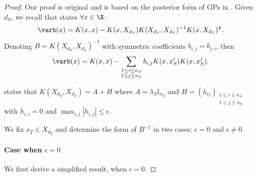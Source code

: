 \begin{proof}
Our proof is original and is based on the posterior form of GPs in .
Given $d_S$, we recall  that states $\forall x\in\X$:
\begin{align*}
    \varb(x) =K(x, x)-K(x, X_{d_S})K(X_{d_S}, X_{d_S})^{-1} K(x, X_{d_S})^\intercal.
\end{align*}
Denoting $B=K(X_{d_S},X_{d_S})^{-1}$ with symmetric coefficients $b_{i,j}=b_{j,i}$, then
\begin{equation} \label{eq:inversion}
    \varb(x) = K(x, x)-\sum_{\substack{1 \leq i \leq n_S \\ 1 \leq j \leq n_S}} b_{i, j} K(x, x_S^i) K(x, x_S^j).
\end{equation}

 states that
$K(X_{d_S}, X_{d_S})=A+H$ where $A=\lambda_S\mathbb{I}_{n_S}$ and $H=(h_{ij})_{\substack{1 \leq i \leq n_S \\ 1 \leq j \leq n_S}}$ with $h_{i,i}=0$ and $\max_{i,j}|h_{i,j}|\leq\epsilon$.

We fix $x_T \in X_{d_T}$ and determine the form of $B^{-1}$ in two cases: $\epsilon=0$ and $\epsilon\neq 0$.

\paragraph{Case when $\epsilon=0$}
We first derive a simplified result, when $\epsilon=0$.


\end{proof}
